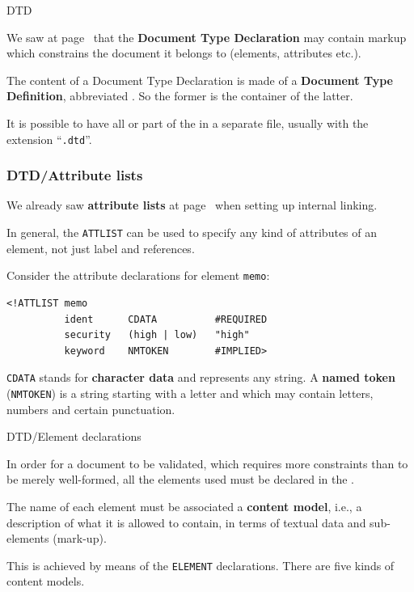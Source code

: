 
%
\begin{frame}{DTD}

We saw at page~\pageref{xml_intro:DOCTYPE} that the \textbf{Document
  Type Declaration} may contain markup which constrains the \XML
document it belongs to (elements, attributes etc.).

\bigskip

The content of a Document Type Declaration is made of a
\textbf{Document Type Definition}, abbreviated \DTD. So the
former is the container of the latter.

\bigskip

It is possible to have all or part of the \DTD in a separate file,
usually with the extension ``\texttt{.dtd}''.

\end{frame}

%
\begin{frame}[containsverbatim]
\frametitle{DTD/Attribute lists}

We already saw \textbf{attribute lists} at
page~\pageref{xml_intro:ATTLIST} when setting up internal linking.

\bigskip

In general, the \texttt{ATTLIST} can be used to specify any kind of
attributes of an element, not just label and references.

\bigskip

Consider the attribute declarations for element \texttt{memo}:
{\small
\begin{verbatim}
<!ATTLIST memo
          ident      CDATA          #REQUIRED
          security   (high | low)   "high"
          keyword    NMTOKEN        #IMPLIED>
\end{verbatim}
}
\texttt{CDATA} stands for \textbf{character data} and represents any
string. A \textbf{named token} (\texttt{NMTOKEN}) is a string starting
with a letter and which may contain letters, numbers and certain
punctuation.

\end{frame}

%
\begin{frame}{DTD/Element declarations}

In order for a document to be validated, which requires more
constraints than to be merely well-formed, all the elements used
must be declared in the \DTD.

\bigskip

The name of each element must be associated a \textbf{content model},
i.e., a description of what it is allowed to contain, in terms of
textual data and sub-elements (mark-up).

\bigskip

This is achieved by means of the \DTD \texttt{ELEMENT}
declarations. There are five kinds of content models.

\end{frame}

